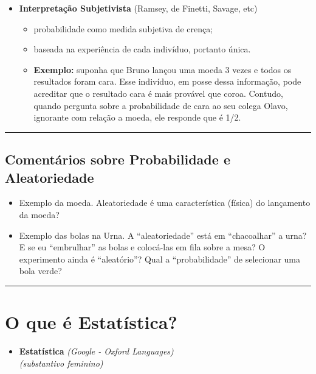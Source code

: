 \documentclass[
]{book}
\providecommand{\tightlist}{%
  \setlength{\itemsep}{0pt}\setlength{\parskip}{0pt}}
\begin{document}
\begin{itemize}
\tightlist
\item
  \textbf{Interpretação Subjetivista} (Ramsey, de Finetti, Savage, etc)

  \begin{itemize}
  \tightlist
  \item
    probabilidade como medida subjetiva de crença;
  \item
    baseada na experiência de cada indivíduo, portanto única.
  \item
    \textbf{Exemplo:} suponha que Bruno lançou uma moeda 3 vezes e todos os resultados foram cara. Esse indivíduo, em posse dessa informação, pode acreditar que o resultado cara é mais provável que coroa. Contudo, quando pergunta sobre a probabilidade de cara ao seu colega Olavo, ignorante com relação a moeda, ele responde que é 1/2.
  \end{itemize}
\end{itemize}

\begin{center}\rule{0.5\linewidth}{0.5pt}\end{center}

\subsection{Comentários sobre Probabilidade e Aleatoriedade}\label{comentuxe1rios-sobre-probabilidade-e-aleatoriedade}

\begin{itemize}
\item
  Exemplo da moeda. Aleatoriedade é uma característica (física) do lançamento da moeda?
\item
  Exemplo das bolas na Urna. A ``aleatoriedade'' está em ``chacoalhar'' a urna? E se eu ``embrulhar'' as bolas e colocá-las em fila sobre a mesa? O experimento ainda é ``aleatório''? Qual a ``probabilidade'' de selecionar uma bola verde?
\end{itemize}

\begin{center}\rule{0.5\linewidth}{0.5pt}\end{center}

\section{O que é Estatística?}\label{o-que-uxe9-estatuxedstica}

\begin{itemize}
\tightlist
\item
  \textbf{Estatística} \emph{(Google - Oxford Languages)}\\
  \emph{(substantivo feminino)}\\
\end{itemize}
\end{document}

